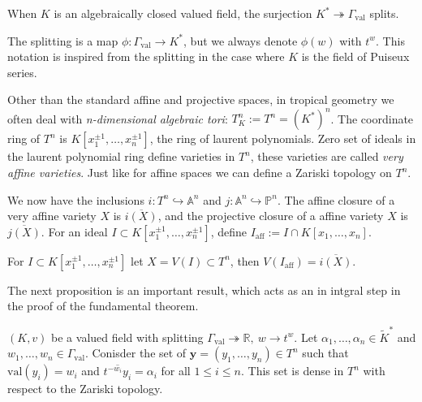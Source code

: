     \begin{lemma}
        When $K$ is an algebraically closed valued field, the surjection $K^{*} \twoheadrightarrow \Gamma_{\text{val}}$ splits.
    \end{lemma}
    The splitting is a map $\phi: \Gamma_{\text{val}} \to K^{*}$, but we always denote $\phi(w)$ with $t^w$. This notation is inspired from the splitting in the case where $K$ is the field of Puiseux series.
    \par Other than the standard affine and projective spaces, in tropical geometry we often deal with \textit{n-dimensional algebraic tori}: $T^{n}_{K} := T^n = (K^{*})^n$. 
    The coordinate ring of $T^{n}$ is $K[x_{1}^{\pm 1},\dots,x_{n}^{\pm 1}]$, the ring of laurent polynomials. 
    Zero set of ideals in the laurent polynomial ring define varieties in $T^n$, these varieties are called \textit{very affine varieties}.
    Just like for affine spaces we can define a Zariski topology on $T^{n}$.
    \par We now have the inclusions $i: T^{n} \hookrightarrow \mathbb{A}^n$ and $j: \mathbb{A}^{n} \hookrightarrow \mathbb{P}^{n}$. 
    The affine closure of a very affine variety $X$ is $\overline{i(X)}$, and the projective closure of a affine variety $X$ is $\overline{j(X)}$. 
    For an ideal $I \subset K[x_{1}^{\pm 1},\dots,x_{n}^{\pm 1}]$, define $I_{\text{aff}}:= I \cap K[x_{1},\dots,x_{n}]$.
    \begin{proposition}
        For $I \subset K[x_{1}^{\pm 1},\dots,x_{n}^{\pm 1}]$ let $X = V(I) \subset T^n$, then $V(I_{\text{aff}}) = \overline{i(X)}$.
    \end{proposition}
    The next proposition is an important result, which acts as an in intgral step in the proof of the fundamental theorem.
    \begin{proposition}
        \label{densenessprop}
        $(K,v)$ be a valued field with splitting $\Gamma_{\text{val}} \twoheadrightarrow \mathbb{R},~w \to t^{w}$.
        Let $\alpha_{1}, \dots,\alpha_{n} \in \tilde{K}^{*}$ and $w_1, \dots, w_n \in \Gamma_{\text{val}}$. 
        Conisder the set of $\textbf{y} = (y_1, \dots, y_n) \in T^{n}$ such that $\text{val}(y_{i}) = w_{i}$ and $\overline{t^{-w_i}y_i} = \alpha_{i}$ for all $1\leq i \leq n$.
        This set is dense in $T^n$ with respect to the Zariski topology.
    \end{proposition}

